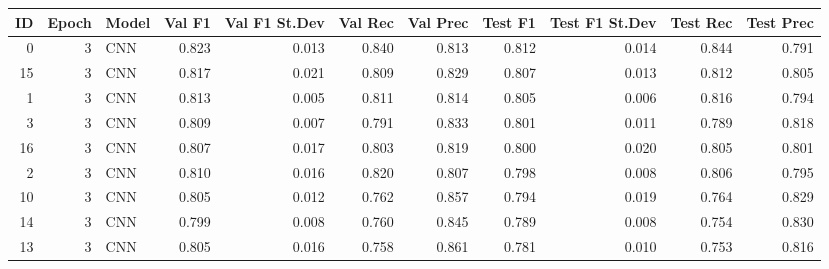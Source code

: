\begin{tabular}{rrlrrrrrrrr}
\toprule
 ID &  Epoch & Model &  Val F1 &  Val F1 St.Dev &  Val Rec &  Val Prec &  Test F1 &  Test F1 St.Dev &  Test Rec &  Test Prec \\
\midrule
  0 &      3 &   CNN &   0.823 &          0.013 &    0.840 &     0.813 &    0.812 &           0.014 &     0.844 &      0.791 \\
 15 &      3 &   CNN &   0.817 &          0.021 &    0.809 &     0.829 &    0.807 &           0.013 &     0.812 &      0.805 \\
  1 &      3 &   CNN &   0.813 &          0.005 &    0.811 &     0.814 &    0.805 &           0.006 &     0.816 &      0.794 \\
  3 &      3 &   CNN &   0.809 &          0.007 &    0.791 &     0.833 &    0.801 &           0.011 &     0.789 &      0.818 \\
 16 &      3 &   CNN &   0.807 &          0.017 &    0.803 &     0.819 &    0.800 &           0.020 &     0.805 &      0.801 \\
  2 &      3 &   CNN &   0.810 &          0.016 &    0.820 &     0.807 &    0.798 &           0.008 &     0.806 &      0.795 \\
 10 &      3 &   CNN &   0.805 &          0.012 &    0.762 &     0.857 &    0.794 &           0.019 &     0.764 &      0.829 \\
 14 &      3 &   CNN &   0.799 &          0.008 &    0.760 &     0.845 &    0.789 &           0.008 &     0.754 &      0.830 \\
 13 &      3 &   CNN &   0.805 &          0.016 &    0.758 &     0.861 &    0.781 &           0.010 &     0.753 &      0.816 \\
\bottomrule
\end{tabular}
